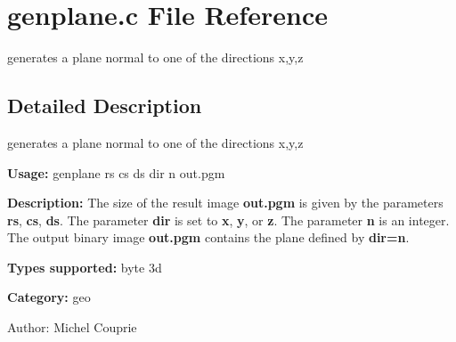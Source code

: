 \section{genplane.c File Reference}
\label{genplane_8c}
generates a plane normal to one of the directions x,y,z 



\subsection{Detailed Description}
generates a plane normal to one of the directions x,y,z 

{\bf Usage:} genplane rs cs ds dir n out.pgm

{\bf Description:} The size of the result image {\bf out.pgm} is given by the parameters {\bf rs}, {\bf cs}, {\bf ds}. The parameter {\bf dir} is set to {\bf x}, {\bf y}, or {\bf z}. The parameter {\bf n} is an integer. The output binary image {\bf out.pgm} contains the plane defined by {\bf dir=n}.

{\bf Types supported:} byte 3d

{\bf Category:} geo

\begin{Desc}
\item[Author:]Michel Couprie \end{Desc}
